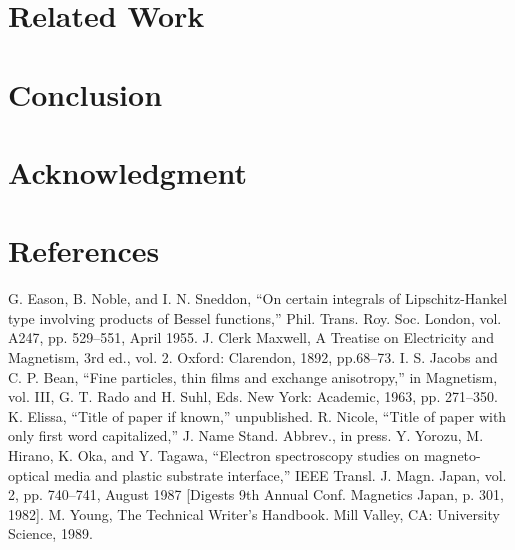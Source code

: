 \documentclass[conference]{IEEEtran}
\begin{document}
\section{Related Work}

\section{Conclusion}

\section*{Acknowledgment}

\section*{References}


\begin{thebibliography}{00}
 G. Eason, B. Noble, and I. N. Sneddon, ``On certain integrals of Lipschitz-Hankel type involving products of Bessel functions,'' Phil. Trans. Roy. Soc. London, vol. A247, pp. 529--551, April 1955.
 J. Clerk Maxwell, A Treatise on Electricity and Magnetism, 3rd ed., vol. 2. Oxford: Clarendon, 1892, pp.68--73.
 I. S. Jacobs and C. P. Bean, ``Fine particles, thin films and exchange anisotropy,'' in Magnetism, vol. III, G. T. Rado and H. Suhl, Eds. New York: Academic, 1963, pp. 271--350.
 K. Elissa, ``Title of paper if known,'' unpublished.
 R. Nicole, ``Title of paper with only first word capitalized,'' J. Name Stand. Abbrev., in press.
 Y. Yorozu, M. Hirano, K. Oka, and Y. Tagawa, ``Electron spectroscopy studies on magneto-optical media and plastic substrate interface,'' IEEE Transl. J. Magn. Japan, vol. 2, pp. 740--741, August 1987 [Digests 9th Annual Conf. Magnetics Japan, p. 301, 1982].
 M. Young, The Technical Writer's Handbook. Mill Valley, CA: University Science, 1989.
\end{thebibliography}
\end{document}
